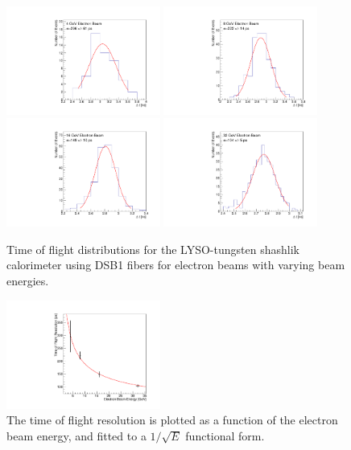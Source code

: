 \documentclass[11pt]{article}
\begin{document}
\begin{figure}[h] \centering
\includegraphics[width=0.45\textwidth]{figs/TOF_ShashlikDSB1Fiber_Electron_4GeV} 
\includegraphics[width=0.45\textwidth]{figs/TOF_ShashlikDSB1Fiber_Electron_8GeV} 
\includegraphics[width=0.45\textwidth]{figs/TOF_ShashlikDSB1Fiber_Electron_16GeV} 
\includegraphics[width=0.45\textwidth]{figs/TOF_ShashlikDSB1Fiber_Electron_32GeV} 
\caption{ Time of flight distributions for the LYSO-tungsten shashlik calorimeter
using DSB1 fibers for electron beams with varying beam energies. } 
\label{fig:ShashlikFiberTOF}
\end{figure}

\begin{figure}[h] \centering
\includegraphics[width=0.45\textwidth]{figs/TimeResolutionVsEnergy_ShashlikDSB1Fiber} 
\caption{ The time of flight resolution is plotted as a function of
the electron beam energy, and fitted to a $1/\sqrt{E}$ functional form. }
\label{fig:ShashlikFiberTOFResolutionVsEnergy}
\end{figure}
\end{document}
